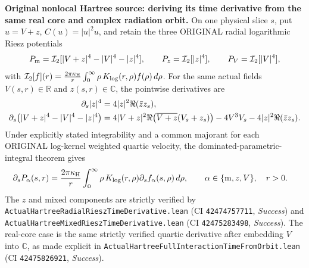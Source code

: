 \documentclass[11pt]{amsart}
\begin{document}
\medskip
\noindent\textbf{Original nonlocal Hartree source: deriving its time
derivative from the same real core and complex radiation orbit.}
On one physical slice \(s\), put \(u=V+z\),
\(C(u)=|u|^2u\), and retain the three ORIGINAL radial
logarithmic Riesz potentials
\[
 P_{\rm m}=\mathcal I_2[|V+z|^4-|V|^4-|z|^4],
 \qquad
 P_z=\mathcal I_2[|z|^4],
 \qquad
 P_V=\mathcal I_2[|V|^4],
\]
with \(\mathcal I_2[f](r)=
 \frac{2\pi\kappa_{\rm H}}{r}
 \int_0^\infty \rho\,K_{\log}(r,\rho) f(\rho)\,d\rho\).
For the same actual fields \(V(s,r)\in\mathbb R\) and
\(z(s,r)\in\mathbb C\), the pointwise derivatives are
\begin{align}
 \partial_s|z|^4
 &=4|z|^2\Re(\bar z z_s),\notag\\
 \partial_s\bigl(|V+z|^4-|V|^4-|z|^4\bigr)
 &=4|V+z|^2\Re\bigl(\overline{V+z}(V_s+z_s)\bigr)
   -4V^3 V_s-4|z|^2\Re(\bar z z_s).
 \label{eq:true-hartree-three-quartic-densities-time}
\end{align}
Under explicitly stated integrability and a common majorant for
each ORIGINAL log-kernel weighted quartic velocity,
the dominated-parametric-integral theorem gives
\begin{align}
 \partial_sP_\alpha(s,r)
 &=
 \frac{2\pi\kappa_{\rm H}}{r}
 \int_0^\infty \rho\,K_{\log}(r,\rho)
       \partial_s f_\alpha(s,\rho)\,d\rho,
 \qquad \alpha\in\{{\rm m},z,V\},\quad r>0.
 \label{eq:true-hartree-three-riesz-potentials-time}
\end{align}
The \(z\) and mixed components are strictly verified by
\texttt{ActualHartreeRadialRieszTimeDerivative.lean}
(CI \texttt{42474757711}, \emph{Success}) and
\texttt{ActualHartreeMixedRieszTimeDerivative.lean}
(CI \texttt{42475283498}, \emph{Success}).
The real-core case is the same strictly verified quartic derivative
after embedding \(V\) into \(\mathbb C\), as made explicit in
\texttt{ActualHartreeFullInteractionTimeFromOrbit.lean}
(CI \texttt{42475826921}, \emph{Success}).
\end{document}
